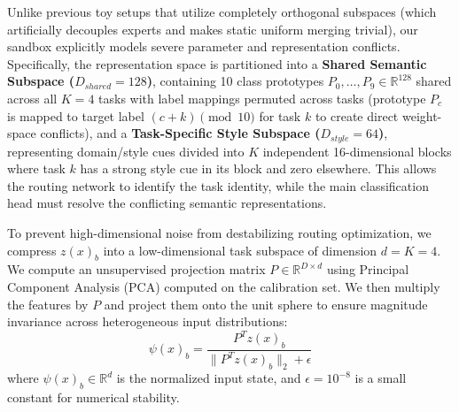 Unlike previous toy setups that utilize completely orthogonal subspaces (which artificially decouples experts and makes static uniform merging trivial), our sandbox explicitly models severe parameter and representation conflicts. Specifically, the representation space is partitioned into a \textbf{Shared Semantic Subspace ($D_{shared} = 128$)}, containing 10 class prototypes $P_0, \dots, P_9 \in \mathbb{R}^{128}$ shared across all $K=4$ tasks with label mappings permuted across tasks (prototype $P_c$ is mapped to target label $(c + k) \pmod{10}$ for task $k$ to create direct weight-space conflicts), and a \textbf{Task-Specific Style Subspace ($D_{style} = 64$)}, representing domain/style cues divided into $K$ independent 16-dimensional blocks where task $k$ has a strong style cue in its block and zero elsewhere. This allows the routing network to identify the task identity, while the main classification head must resolve the conflicting semantic representations.

To prevent high-dimensional noise from destabilizing routing optimization, we compress $z(x)_b$ into a low-dimensional task subspace of dimension $d = K = 4$. We compute an unsupervised projection matrix $P \in \mathbb{R}^{D \times d}$ using Principal Component Analysis (PCA) computed on the calibration set. We then multiply the features by $P$ and project them onto the unit sphere to ensure magnitude invariance across heterogeneous input distributions:
\begin{equation}
    \psi(x)_b = \frac{P^T z(x)_b}{\|P^T z(x)_b\|_2 + \epsilon}
\end{equation}
where $\psi(x)_b \in \mathbb{R}^d$ is the normalized input state, and $\epsilon = 10^{-8}$ is a small constant for numerical stability.

